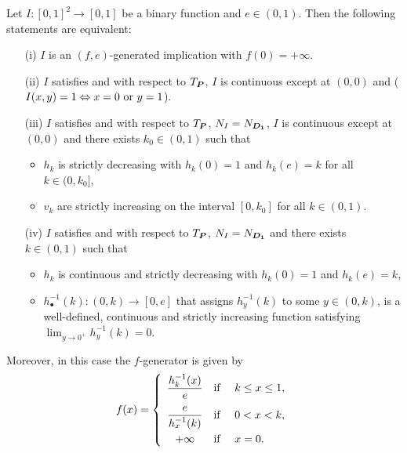 \begin{theorem}\label{caractf0inf}
	Let $I:[0,1]^2\to [0,1]$ be a binary function and $e\in(0,1)$. Then the following statements are equivalent:
	\begin{enumerate}
		\item[(i)] $I$ is an $(f,e)$-generated implication with $f(0)=+\infty$.
		\item[(ii)] $I$ satisfies \LIey and \LIex with respect to $T_{\bm{P}}$, $I$ is continuous except at $(0,0)$ and ($I(x,y)=1 \Leftrightarrow x=0 \hbox{ or } y=1$). 
		\item[(iii)] $I$ satisfies \LIey and \LIex with respect to $T_{\bm{P}}$, $N_I=N_{\bm{D_1}}$, $I$ is continuous except at $(0,0)$ and there exists $k_0\in(0,1)$ such that 
		\begin{itemize}
			\item $h_k$ is strictly decreasing with $h_k(0)=1$ and $h_k(e)=k$ for all $k\in(0,k_0]$,
			\item $v_k$ are strictly increasing on the interval $[0,k_0]$ for all $k\in(0,1)$.
		\end{itemize}
		\item[(iv)] $I$ satisfies \LIey and \LIex with respect to $T_{\bm{P}}$, $N_I=N_{\bm{D_1}}$ and there exists $k\in(0,1)$ such that 
		\begin{itemize}
			\item $h_k$ is continuous and strictly decreasing with $h_k(0)=1$ and $h_k(e)=k$,
			\item $h_{\bullet}^{-1}(k):(0,k)\to[0,e]$ that assigns $h_y^{-1}(k)$ to some $y\in(0,k)$, is a well-defined, continuous and strictly increasing function satisfying 
			$\displaystyle \lim_{y\to 0^+}{h_y^{-1}(k)}=0$. 
		\end{itemize}
	\end{enumerate}
	Moreover, in this case the $f$-generator is given by
	\begin{equation}
		\label{fgen}
		f(x)=\left\{\begin{array}{ccl} \dfrac{h_k^{-1}(x)}{e} &\hbox{if }& k\leq x \leq 1,\\[1em] \dfrac{e}{h_x^{-1}(k)}&\hbox{if }& 0<x<k,\\[1em] +\infty &\hbox{if }& x=0.\end{array}\right.
	\end{equation}
\end{theorem}
